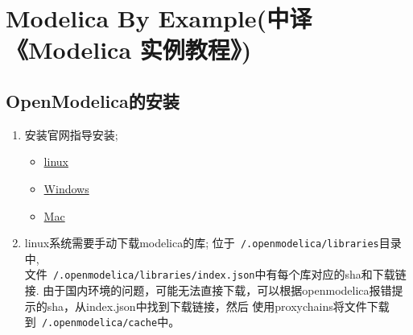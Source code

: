 \chapter{Modelica By Example(中译《Modelica 实例教程》)}

\section{OpenModelica的安装}
\begin{enumerate}
    \item 安装官网指导安装;
    \begin{itemize}
        \item \href{https://openmodelica.org/download/download-linux/}{linux}
        \item \href{https://openmodelica.org/download/download-windows/}{Windows}
        \item \href{https://openmodelica.org/download/download-mac/}{Mac}
    \end{itemize}
    \item linux系统需要手动下载modelica的库;
          位于\texttt{~/.openmodelica/libraries}目录中,\\
          文件\texttt{~/.openmodelica/libraries/index.json}中有每个库对应的sha和下载链接.
          由于国内环境的问题，可能无法直接下载，可以根据openmodelica报错提示的sha，从index.json中找到下载链接，然后
          使用proxychains将文件下载到\texttt{~/.openmodelica/cache}中。

\end{enumerate}